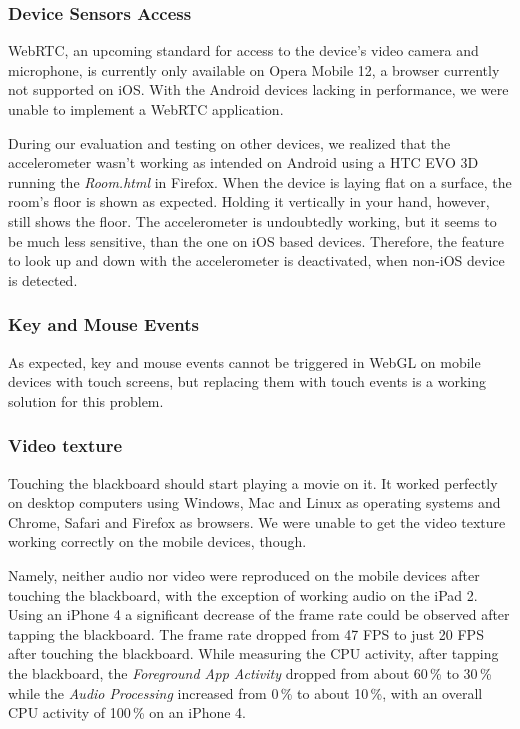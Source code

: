 \documentclass[12pt,journal,compsoc]{IEEEtran}
\begin{document}
\subsubsection{Device Sensors Access}\label{deviceSensors}
WebRTC, an upcoming standard for access to the device’s video camera and microphone, is currently only available on Opera Mobile 12, a browser currently not supported on iOS. With the Android devices lacking in performance, we were unable to implement a WebRTC application.

During our evaluation and testing on other devices, we realized that the accelerometer wasn’t working as intended on Android using a HTC EVO 3D running the \textit{Room.html} in Firefox. When the device is laying flat on a surface, the room’s floor is shown as expected. Holding it vertically in your hand, however, still shows the floor. The accelerometer is undoubtedly working, but it seems to be much less sensitive, than the one on iOS based devices. Therefore, the feature to look up and down with the accelerometer is deactivated, when non-iOS device is detected.

\subsubsection{Key and Mouse Events}
As expected, key and mouse events cannot be triggered in WebGL on mobile devices with touch screens, but replacing them with touch events is a working solution for this problem.

\subsubsection{Video texture}
Touching the blackboard should start playing a movie on it. It worked perfectly on desktop computers using Windows, Mac and Linux as operating systems and Chrome, Safari and Firefox as browsers. We were unable to get the video texture working correctly on the mobile devices, though.

Namely, neither audio nor video were reproduced on the mobile devices after touching the blackboard, with the exception of working audio on the iPad 2. Using an iPhone 4 a significant decrease of the frame rate could be observed after tapping the blackboard. The frame rate dropped from 47 FPS to just 20 FPS after touching the blackboard. While measuring the CPU activity, after tapping the blackboard, the \textit{Foreground App Activity} dropped from about 60\,\% to 30\,\% while the \textit{Audio Processing} increased from 0\,\% to about 10\,\%, with an overall CPU activity of 100\,\% on an iPhone 4.
\end{document}
